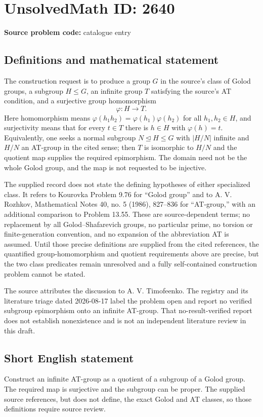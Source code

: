 \documentclass[11pt]{article}
\begin{document}
\section*{UnsolvedMath ID: 2640}
\textbf{Source problem code:} catalogue entry
\subsection{Definitions and mathematical statement}
The construction request is to produce a group $G$ in the source's class of Golod groups, a subgroup $H\leq G$, an infinite group $T$ satisfying the source's AT condition, and a surjective group homomorphism
\[
\varphi:H\longrightarrow T.
\]
Here homomorphism means $\varphi(h_1h_2)=\varphi(h_1)\varphi(h_2)$ for all $h_1,h_2\in H$, and surjectivity means that for every $t\in T$ there is $h\in H$ with $\varphi(h)=t$. Equivalently, one seeks a normal subgroup $N\trianglelefteq H\leq G$ with $|H/N|$ infinite and $H/N$ an AT-group in the cited sense; then $T$ is isomorphic to $H/N$ and the quotient map supplies the required epimorphism. The domain need not be the whole Golod group, and the map is not requested to be injective.

The supplied record does not state the defining hypotheses of either specialized class. It refers to Kourovka Problem 9.76 for ``Golod group'' and to A. V. Rozhkov, Mathematical Notes 40, no. 5 (1986), 827--836 for ``AT-group,'' with an additional comparison to Problem 13.55. These are source-dependent terms; no replacement by all Golod--Shafarevich groups, no particular prime, no torsion or finite-generation convention, and no expansion of the abbreviation AT is assumed. Until those precise definitions are supplied from the cited references, the quantified group-homomorphism and quotient requirements above are precise, but the two class predicates remain unresolved and a fully self-contained construction problem cannot be stated.

The source attributes the discussion to A. V. Timofeenko. The registry and its literature triage dated 2026-08-17 label the problem open and report no verified subgroup epimorphism onto an infinite AT-group. That no-result-verified report does not establish nonexistence and is not an independent literature review in this draft.
\subsection{Short English statement}
Construct an infinite AT-group as a quotient of a subgroup of a Golod group. The required map is surjective and the subgroup can be proper. The supplied source references, but does not define, the exact Golod and AT classes, so those definitions require source review.
\end{document}
